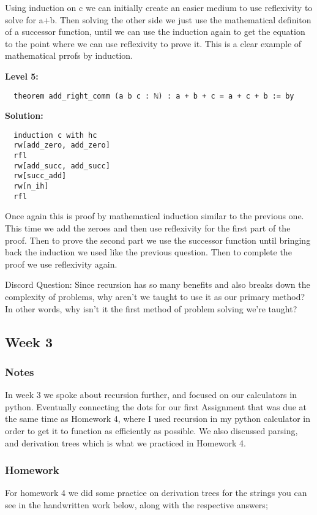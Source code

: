 \documentclass{article}
\theoremstyle{theorem}
\theoremstyle{definition}
\theoremstyle{remark}
\begin{document}
\begin{enumerate}
  Using induction on c we can initially create an easier medium to use reflexivity to solve for a+b. Then solving the other side we just use the mathematical definiton of a successor function, until we can use the induction again to get the equation to the point where we can use reflexivity to prove it. This is a clear example of mathematical prrofs by induction.

  \textbf{Level 5:}
  \begin{verbatim}
  theorem add_right_comm (a b c : ℕ) : a + b + c = a + c + b := by
  \end{verbatim}

  \textbf{Solution:}
  \begin{verbatim}
  induction c with hc
  rw[add_zero, add_zero]
  rfl
  rw[add_succ, add_succ]
  rw[succ_add]
  rw[n_ih]
  rfl
  \end{verbatim}

  Once again this is proof by mathematical induction similar to the previous one. This time we add the zeroes and then use reflexivity for the first part of the proof. Then to prove the second part we use the successor function until bringing back the induction we used like the previous question. Then to complete the proof we use reflexivity again. 

\end{enumerate}

Discord Question: Since recursion has so many benefits and also breaks down the complexity of problems, why aren't we taught to use it as our primary method? In other words, why isn't it the first method of problem solving we're taught?

\subsection{Week 3}
\subsubsection*{Notes}
In week 3 we spoke about recursion further, and focused on our calculators in python. Eventually connecting the dots for our first Assignment that was due at the same time as Homework 4, where I used recursion in my python calculator in order to get it to function as efficiently as possible. We also discussed parsing, and derivation trees which is what we practiced in Homework 4.

\subsubsection*{Homework}
For homework 4 we did some practice on derivation trees for the strings you can see in the handwritten work below, along with the respective answers;
\end{document}
